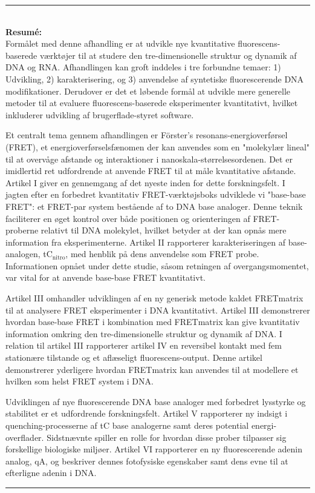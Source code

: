 \begin{vcentrepage}
\noindent\rule[2pt]{\textwidth}{0.2pt}\\

{\large\textbf{Resumé:}\\}
Formålet med denne afhandling er at udvikle nye kvantitative fluorescens-baserede værktøjer til at studere den tre-dimensionelle struktur og dynamik af DNA og RNA. Afhandlingen kan groft inddeles i tre forbundne temaer: 1) Udvikling, 2) karakterisering, og 3) anvendelse af syntetiske fluorescerende DNA modifikationer. Derudover er det et løbende formål at udvikle mere generelle metoder til at evaluere fluorescens-baserede eksperimenter kvantitativt, hvilket inkluderer udvikling af brugerflade-styret software.

Et centralt tema gennem afhandlingen er Förster's resonans-energioverførsel (FRET), et energioverførselsfænomen der kan anvendes som en "molekylær lineal" til at overvåge afstande og interaktioner i nanoskala-størrelsesordenen. Det er imidlertid ret udfordrende at anvende FRET til at måle kvantitative afstande. Artikel I giver en gennemgang af det nyeste inden for dette forskningsfelt. I jagten efter en forbedret kvantitativ FRET-værktøjsboks udviklede vi "base-base FRET": et FRET-par system bestående af to DNA base analoger. Denne teknik faciliterer en øget kontrol over både positionen og orienteringen af FRET-proberne relativt til DNA molekylet, hvilket betyder at der kan opnås mere information fra eksperimenterne. Artikel II rapporterer karakteriseringen af base-analogen, tC$_\mathrm{nitro}$, med henblik på dens anvendelse som FRET probe. Informationen opnået under dette studie, såsom retningen af overgangsmomentet, var vital for at anvende base-base FRET kvantitativt.

Artikel III omhandler udviklingen af en ny generisk metode kaldet FRETmatrix til at analysere FRET eksperimenter i DNA kvantitativt. Artikel III demonstrerer hvordan base-base FRET i kombination med FRETmatrix kan give kvantitativ information omkring den tre-dimensionelle struktur og dynamik af DNA. I relation til artikel III rapporterer artikel IV en reversibel kontakt med fem stationære tilstande og et aflæseligt fluorescens-output. Denne artikel demonstrerer yderligere hvordan FRETmatrix kan anvendes til at modellere et hvilken som helst FRET system i DNA.

Udviklingen af nye fluorescerende DNA base analoger med forbedret lysstyrke og stabilitet er et udfordrende forskningsfelt. Artikel V rapporterer ny indsigt i quenching-processerne af tC base analogerne samt deres potential energi-overflader. Sidstnævnte spiller en rolle for hvordan disse prober tilpasser sig forskellige biologiske miljøer. Artikel VI rapporterer en ny fluorescerende adenin analog, qA, og beskriver dennes fotofysiske egenskaber samt dens evne til at efterligne adenin i DNA.



\noindent\rule[2pt]{\textwidth}{0.8pt}
\end{vcentrepage}
